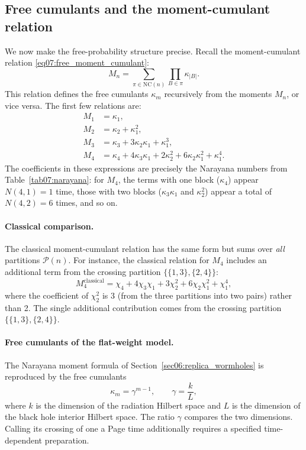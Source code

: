 \documentclass[11pt,letterpaper]{article}
\theoremstyle{plain}
\theoremstyle{definition}
\theoremstyle{remark}
\begin{document}
\subsection{Free cumulants and the moment-cumulant relation}
\label{subsec07:free_cumulants}

We now make the free-probability structure precise.  Recall the
moment-cumulant relation \eqref{eq07:free_moment_cumulant}:
\begin{equation}
  M_n = \sum_{\pi \in \mathrm{NC}(n)} \prod_{B \in \pi} \kappa_{|B|}.
  \label{eq07:free_mc_repeat}
\end{equation}
This relation defines the free cumulants $\kappa_m$ recursively from the
moments $M_n$, or vice versa.  The first few relations are:
\begin{align}
  M_1 &= \kappa_1, \label{eq07:mc1} \\
  M_2 &= \kappa_2 + \kappa_1^2, \label{eq07:mc2} \\
  M_3 &= \kappa_3 + 3\kappa_2\kappa_1 + \kappa_1^3, \label{eq07:mc3} \\
  M_4 &= \kappa_4 + 4\kappa_3\kappa_1 + 2\kappa_2^2
        + 6\kappa_2\kappa_1^2 + \kappa_1^4. \label{eq07:mc4}
\end{align}
The coefficients in these expressions are precisely the Narayana numbers
from Table~\ref{tab07:narayana}: for $M_4$, the terms with one block
($\kappa_4$) appear $N(4,1)=1$ time, those with two blocks
($\kappa_3\kappa_1$ and $\kappa_2^2$) appear a total of $N(4,2)=6$
times, and so on.

\paragraph{Classical comparison.}
The classical moment-cumulant relation has the same form but sums over
\emph{all} partitions $\mathcal{P}(n)$.  For instance, the classical
relation for $M_4$ includes an additional term from the crossing partition
$\{\{1,3\},\{2,4\}\}$:
\begin{equation}
  M_4^{\text{classical}} = \chi_4 + 4\chi_3 \chi_1 + 3\chi_2^2 + 6\chi_2 \chi_1^2
  + \chi_1^4,
  \label{eq07:classical_m4}
\end{equation}
where the coefficient of $\chi_2^2$ is 3 (from the three partitions into
two pairs) rather than 2.  The single additional contribution comes from
the crossing partition $\{\{1,3\},\{2,4\}\}$.

\paragraph{Free cumulants of the flat-weight model.}
The Narayana moment formula of Section~\ref{sec06:replica_wormholes} is
reproduced by the free cumulants
\begin{equation}
  \boxed{
    \kappa_m = \gamma^{m-1}, \qquad \gamma = \frac{k}{L},
  }
  \label{eq07:gravity_cumulants}
\end{equation}
where $k$ is the dimension of the radiation Hilbert space and $L$ is the
dimension of the black hole interior Hilbert space.  The ratio $\gamma$ compares the two dimensions.  Calling its crossing of
one a Page time additionally requires a specified time-dependent preparation.
\end{document}
